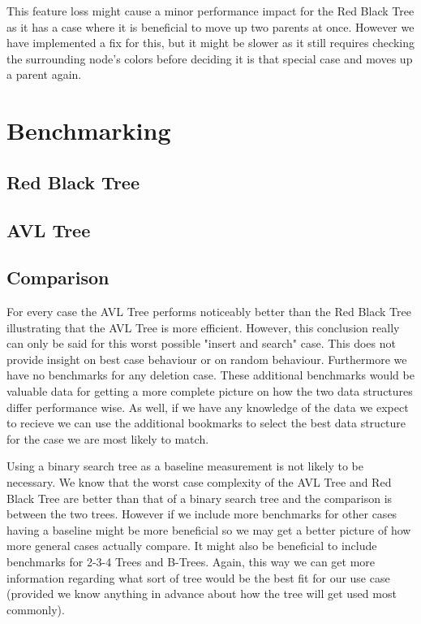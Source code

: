 \documentclass[12pt, letterpaper]{article}
\begin{document}
This feature loss might cause a minor performance impact for the Red Black Tree as it has a case where it is beneficial
to move up two parents at once.  However we have implemented a fix for this, but it might be slower as it still requires
checking the surrounding node's colors before deciding it is that special case and moves up a parent again.

\section{Benchmarking}

\subsection{Red Black Tree}

\subsection{AVL Tree}

\subsection{Comparison}
For every case the AVL Tree performs noticeably better than the Red Black Tree illustrating that the AVL Tree is more efficient.
However, this conclusion really can only be said for this worst possible "insert and search" case.  This does not provide insight on best case behaviour or on random behaviour.
Furthermore we have no benchmarks for any deletion case.  These additional benchmarks would be valuable data for getting a more complete picture on how
the two data structures differ performance wise.  As well, if we have any knowledge of the data we expect to recieve we can use the additional bookmarks to select the best data structure for the
case we are most likely to match.

Using a binary search tree as a baseline measurement is not likely to be necessary.  We know that the worst case complexity of the AVL Tree and Red Black Tree are better than
that of a binary search tree and the comparison is between the two trees.  However if we include more benchmarks for other cases having a baseline might be more beneficial
so we may get a better picture of how more general cases actually compare.  It might also be beneficial to include benchmarks for 2-3-4 Trees and B-Trees.  Again, this way we can get
more information regarding what sort of tree would be the best fit for our use case (provided we know anything in advance about how the tree will get used most commonly).
\end{document}
